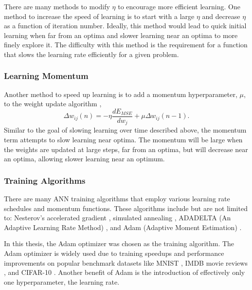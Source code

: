 There are many methods to modify $\eta$ to encourage more efficient learning. One method to increase the speed of learning is to start with a large $\eta$ and decrease $\eta$ as a function of iteration number. Ideally, this method would lead to quick initial learning when far from an optima and slower learning near an optima to more finely explore it. The difficulty with this method is the requirement for a function that slows the learning rate efficiently for a given problem.

\subsubsection{Learning Momentum}

Another method to speed up learning is to add a momentum hyperparameter, $\mu$, to the weight update algorithm \cite{Yu1997}, 
%
\begin{equation} \label{eq:update_momentum}
\Delta w_{ij}(n) = - \eta \frac{dE_{MSE}}{dw_j} +\mu \Delta w_{ij}(n-1).
\end{equation}
%
Similar to the goal of slowing learning over time described above, the momentum term attempts to slow learning near optima. The momentum will be large when the weights are updated at large steps, far from an optima, but will decrease near an optima, allowing slower learning near an optimum. 
 
\subsubsection{Training Algorithms}

There are many ANN training algorithms that employ various learning rate schedules and momentum functions. These algorithms include but are not limited to: Nesterov's accelerated gradient \cite{nesterov1983}, simulated annealing \cite{Kirkpatrick1983}, ADADELTA (An Adaptive Learning Rate Method) \cite{ADADELTA}, and Adam (Adaptive Moment Estimation) \cite{Kingma2015}. 

In this thesis, the Adam optimizer was chosen as the training algorithm. The Adam optimizer is widely used due to training speedups and performance improvements on popular benchmark datasets like MNIST \cite{lecun98}, IMDB movie reviews \cite{Maas2011}, and CIFAR-10 \cite{Krizhevsky2009}. Another benefit of Adam is the introduction of effectively only one hyperparameter, the learning rate.

